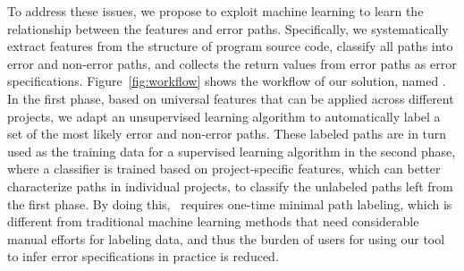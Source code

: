 \documentclass[12pt]{report}	%
\begin{document}
To address these issues, we propose to exploit machine learning to learn the relationship between the features and error paths.
Specifically, we systematically extract features from the structure of program source code,
classify all paths into error and non-error paths,
and collects the return values from error paths as error specifications.
%
Figure~\ref{fig:workflow} shows the workflow of our solution, named \newTool.
In the first phase, based on universal features that can be applied across different projects,
we adapt an unsupervised learning algorithm to 
automatically label a set of the most likely error and non-error paths.
These labeled paths are in turn used as the training data for a supervised learning algorithm
in the second phase,
where a classifier is trained based on project-specific features, 
which can better characterize paths in individual projects,
to classify the unlabeled paths left from the first phase.
%
By doing this, \newTool\ requires one-time minimal path labeling,
which is different from traditional machine learning methods that
need considerable manual efforts for labeling data,
and thus the burden of users for using our tool to infer error specifications in practice is reduced.
\end{document}
